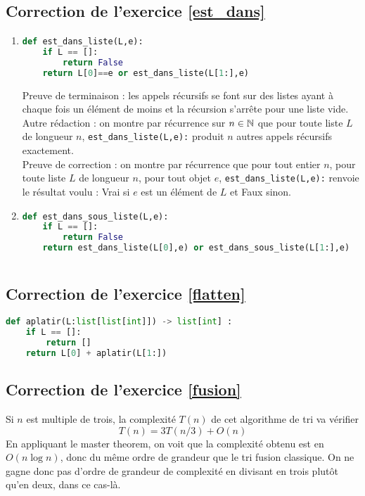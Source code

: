 \documentclass[11pt,a4paper]{article}
\begin{document}
\subsection*{Correction de l'exercice \ref{est_dans}}
\begin{enumerate}
\item 
\begin{lstlisting}[language=Python]
def est_dans_liste(L,e):
	if L == []:
		return False
	return L[0]==e or est_dans_liste(L[1:],e)
\end{lstlisting}
Preuve de terminaison : les appels récursifs se font sur des listes ayant à chaque fois un élément de moins et la récursion s'arrête pour une liste vide.\\
Autre rédaction : on montre par récurrence sur $n\in\mathbb{N}$ que pour toute liste $L$ de longueur $n$, \verb+est_dans_liste(L,e):+ produit $n$ autres appels récursifs exactement.\\
Preuve de correction : on montre par récurrence que pour tout entier $n$, pour toute liste $L$ de longueur $n$, pour tout objet $e$, \verb+est_dans_liste(L,e):+ renvoie le résultat voulu : Vrai si $e$ est un élément de $L$ et Faux sinon.
\item 
\begin{lstlisting}[language=Python]
def est_dans_sous_liste(L,e):
	if L == []:
		return False
	return est_dans_liste(L[0],e) or est_dans_sous_liste(L[1:],e)
\end{lstlisting}
\end{enumerate}
\begin{lstlisting}[language=Python]
\end{lstlisting}

\subsection*{Correction de l'exercice \ref{flatten}}

\begin{lstlisting}[language=Python]
def aplatir(L:list[list[int]]) -> list[int] :
	if L == []:
		return []
	return L[0] + aplatir(L[1:])
\end{lstlisting}

\subsection*{Correction de l'exercice \ref{fusion}}

Si $n$ est multiple de trois, la complexité $T(n)$ de cet algorithme de tri va vérifier
\[ T(n) = 3T(n/3)+O(n)\]
En appliquant le \og master theorem\fg, on voit que la complexité obtenu est  en $O(n\log n)$, donc du même ordre de grandeur que le tri fusion classique.
On ne gagne donc pas d'ordre de grandeur de complexité en divisant en trois plutôt qu'en deux, dans ce cas-là.
\end{document}
